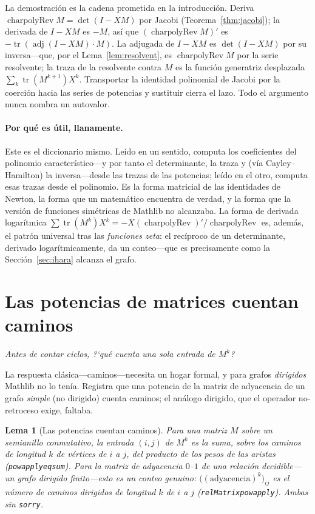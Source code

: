 \documentclass[11pt]{article}
\newtheorem{lemma}{Lema}
\newcommand{\lean}[1]{{\def\_{\textunderscore\allowbreak}\texttt{#1}}}
\newcommand{\tr}{\operatorname{tr}}
\newcommand{\adj}{\operatorname{adj}}
\DeclareMathOperator{\charpolyRev}{charpolyRev}
\begin{document}
La demostraci\'on es la cadena prometida en la introducci\'on. Deriva $\charpolyRev M=\det(I-XM)$ por
Jacobi (Teorema~\ref{thm:jacobi}); la derivada de $I-XM$ es $-M$, as\'i que $(\charpolyRev M)'$ es
$-\tr(\adj(I-XM)\cdot M)$. La adjugada de $I-XM$ es $\det(I-XM)$ por su inversa---que, por el
Lema~\ref{lem:resolvent}, es $\charpolyRev M$ por la serie resolvente; la traza de la resolvente
contra $M$ es la funci\'on generatriz desplazada $\sum_k\tr(M^{k+1})X^k$. Transportar la identidad
polinomial de Jacobi por la coerci\'on hacia las series de potencias y sustituir cierra el lazo. Todo
el argumento nunca nombra un autovalor.

\paragraph{Por qu\'e es \'util, llanamente.}
Este es el diccionario mismo. Le\'ido en un sentido, computa los coeficientes del polinomio
caracter\'istico---y por tanto el determinante, la traza y (v\'ia Cayley--Hamilton) la
inversa---desde las trazas de las potencias; le\'ido en el otro, computa esas trazas desde el
polinomio. Es la forma matricial de las identidades de Newton, la forma que un matem\'atico encuentra
de verdad, y la forma que la versi\'on de funciones sim\'etricas de Mathlib no alcanzaba. La forma de
derivada logar\'itmica $\sum\tr(M^k)X^k=-X(\charpolyRev)'/\charpolyRev$ es, adem\'as, el patr\'on
universal tras las \emph{funciones zeta}: el rec\'iproco de un determinante, derivado
logar\'itmicamente, da un conteo---que es precisamente como la Secci\'on~\ref{sec:ihara} alcanza el
grafo.

\section{Las potencias de matrices cuentan caminos}
\label{sec:walks}

\emph{Antes de contar ciclos, ?`qu\'e cuenta una sola entrada de $M^k$?}

La respuesta cl\'asica---caminos---necesita un hogar formal, y para grafos \emph{dirigidos} Mathlib no
lo ten\'ia. Registra que una potencia de la matriz de adyacencia de un grafo \emph{simple} (no
dirigido) cuenta caminos; el an\'alogo dirigido, que el operador no-retroceso exige, faltaba.

\begin{lemma}[Las potencias cuentan caminos]
\label{lem:walks}
Para una matriz $M$ sobre un semianillo conmutativo, la entrada $(i,j)$ de $M^k$ es la suma, sobre
los caminos de longitud $k$ de v\'ertices de $i$ a $j$, del producto de los pesos de las aristas
(\lean{pow\_apply\_eq\_sum}). Para la matriz de adyacencia $0$--$1$ de una relaci\'on decidible---un
grafo dirigido finito---esto es un conteo genuino: $\bigl((\text{adyacencia})^k\bigr)_{ij}$ es el
n\'umero de caminos dirigidos de longitud $k$ de $i$ a $j$ (\lean{relMatrix\_pow\_apply}). Ambas sin
\lean{sorry}.
\end{lemma}
\end{document}
